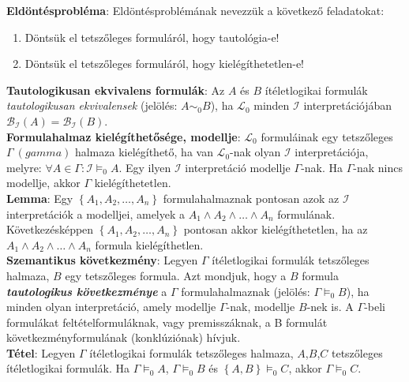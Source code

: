 \documentclass[tikz,12pt,margin=0px]{article}
\begin{document}
	\noindent \textbf{Eldöntésprobléma}: Eldöntésproblémának nevezzük a következő feladatokat:
	\begin{enumerate}
		\item	Döntsük el tetszőleges formuláról, hogy tautológia-e!
		
		\item	Döntsük el tetszőleges formuláról, hogy kielégíthetetlen-e!
	\end{enumerate}
	
    \noindent \textbf{Tautologikusan ekvivalens formulák}: Az $A$ és $B$ ítéletlogikai formulák \textit{tautologikusan ekvivalensek} (jelölés: $A \sim _{0} B$), ha $\mathcal{L}_{0}$ minden $\mathcal{I}$ interpretációjában $\mathcal{B}_{\mathcal{I}}(A)=\mathcal{B}_{\mathcal{I}}(B)$.\\
	
	\noindent \textbf{Formulahalmaz kielégíthetősége, modellje}: $\mathcal{L}_{0}$ formuláinak egy tetszőleges $\Gamma\ (gamma)$ halmaza
	kielégíthető, ha van $\mathcal{L}_{0}$-nak olyan $\mathcal{I}$ interpretációja, melyre: $\forall A \in \Gamma: \mathcal{I} \models_{0} A$.
	Egy ilyen $\mathcal{I}$ interpretáció modellje $\Gamma$-nak. Ha $\Gamma$-nak nincs modellje, akkor $\Gamma$ kielégíthetetlen.\\
	
	\noindent \textbf{Lemma}: Egy $\left\{A_{1},A_{2},\ldots,A_{n}\right\}$ formulahalmaznak pontosan azok az $\mathcal{I}$ interpretációk
	a modelljei, amelyek a $A_{1} \wedge A_{2} \wedge \ldots \wedge A_{n}$ formulának. Következésképpen $\left\{A_{1},A_{2},\ldots,A_{n}\right\}$
	pontosan akkor kielégíthetetlen, ha az $A_{1} \wedge A_{2} \wedge \ldots \wedge A_{n}$ formula kielégíthetlen.\\
	
	\noindent \textbf{Szemantikus következmény}: Legyen $\Gamma$ ítéletlogikai formulák tetszőleges halmaza, $B$ egy tetszőleges formula.
    Azt mondjuk, hogy a $B$ formula \textit{\textbf{tautologikus következménye}} a $\Gamma$ formulahalmaznak (jelölés: $\Gamma \models_{0} B$), ha minden olyan interpretáció, amely modellje $\Gamma$-nak, modellje $B$-nek is. A $\Gamma$-beli formulákat feltételformuláknak, vagy premisszáknak,
	a B formulát következményformulának (konklúziónak) hívjuk.\\
	
	\noindent \textbf{Tétel}: Legyen $\Gamma$ ítéletlogikai formulák tetszőleges halmaza, $A$,$B$,$C$ tetszőleges ítéletlogikai formulák.
	Ha $\Gamma \models_{0} A$, $\Gamma \models_{0} B$ és $\left\{A,B\right\} \models_{0} C$, akkor $\Gamma \models_{0} C$.\\
	
\end{document}
